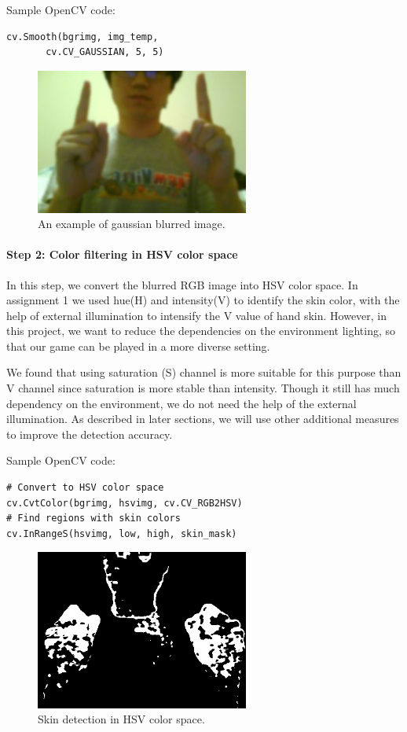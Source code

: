 \documentclass[10pt,twocolumn,letterpaper]{article}
\begin{document}
Sample OpenCV code:
\begin{verbatim}
cv.Smooth(bgrimg, img_temp, 
       cv.CV_GAUSSIAN, 5, 5)
\end{verbatim}

\begin{figure}[h]
\centering
\includegraphics[width=7cm]{gaussian.png}
\caption{An example of gaussian blurred image.}
\label{fig:gaussin}
\end{figure}

\paragraph{Step 2: Color filtering in HSV color space} In this step,  
we convert the blurred RGB image into HSV color space. In assignment 1 we used 
hue(H) and intensity(V) to identify the skin color, with the help of external illumination 
to intensify the V value of hand skin. However, in this project, we want to reduce the 
dependencies on the environment lighting, so that our game can be played in a more diverse
setting.

We found that using saturation (S) channel is more suitable for this purpose 
than V channel since saturation is more stable than intensity. 
Though it still has much dependency on the environment, we do not need the help of 
the external illumination. As described in later sections, we will use other 
additional measures to improve the detection accuracy. 

Sample OpenCV code:
\begin{verbatim}
# Convert to HSV color space
cv.CvtColor(bgrimg, hsvimg, cv.CV_RGB2HSV)
# Find regions with skin colors
cv.InRangeS(hsvimg, low, high, skin_mask)
\end{verbatim}

\begin{figure}[h]
\centering
\includegraphics[width=7cm]{hsv.png}
\caption{Skin detection in HSV color space.}
\label{fig:hsv}
\end{figure}
\end{document}
